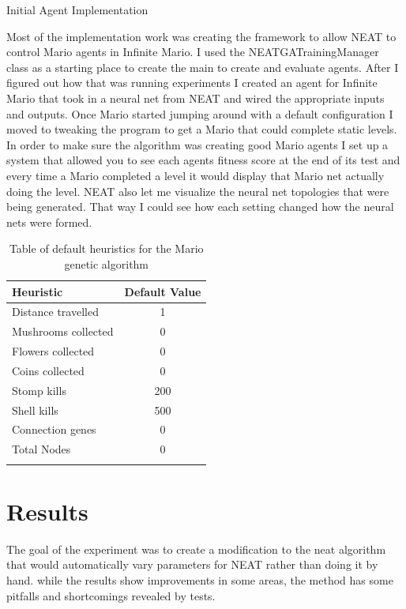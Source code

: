 \documentclass[12pt]{ucthesis} \newif\ifpdf \ifx\pdfoutput\undefined
\begin{document}
Initial Agent Implementation

Most of the implementation work was creating the framework to allow NEAT to
control Mario agents in Infinite Mario. I used the NEATGATrainingManager class
as a starting place to create the main to create and evaluate agents. After I
figured out how that was running experiments I created an agent for Infinite
Mario that took in a neural net from NEAT and wired the appropriate inputs and
outputs. Once Mario started jumping around with a default configuration I moved
to tweaking the program to get a Mario that could complete static levels.
In order to make sure the algorithm was creating good Mario agents I set up a
system that allowed you to see each agents fitness score at the end of its test
and every time a Mario completed a level it would display that Mario net
actually doing the level. NEAT also let me visualize the neural net topologies
that were being generated. That way I could see how each setting changed how the
neural nets were formed.
 
\begin{longtable}{| l | c |}
  \hline
  Heuristic & Default Value \\ \hline                   
  Distance travelled & 1  \\ \hline
  Mushrooms collected & 0 \\ \hline
  Flowers collected & 0  \\ \hline
  Coins collected & 0  \\ \hline
  Stomp kills & 200  \\ \hline
  Shell kills  & 500  \\ \hline
  Connection genes  & 0  \\ \hline
  Total Nodes  & 0  \\ \hline

\caption{Table of default heuristics for the Mario genetic
 algorithm}
\label{tab:Heuristics} 
\end{longtable}

\chapter{Results}

The goal of the experiment was to create a modification to the neat algorithm
that would automatically vary parameters for NEAT rather than doing it by hand.
while the results show improvements in some areas, the method has some pitfalls
and shortcomings revealed by tests.
\end{document}
